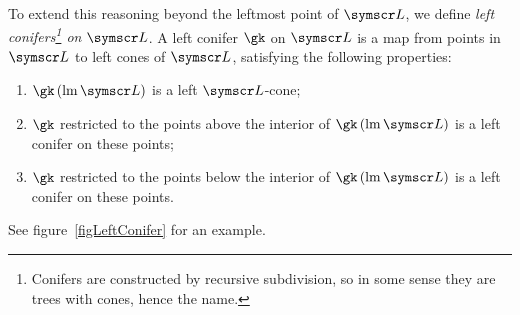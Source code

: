 To extend this reasoning beyond the leftmost point of $\pointset L$, we define \emph{left conifers\footnote{Conifers are
constructed by recursive subdivision, so in some sense they are trees with cones, hence the name.}
on $\pointset L$}.
A left conifer $\gk$ on $\pointset L$ is a map from points in $\pointset L$ to left
cones of $\pointset L$,
satisfying the following properties:
\begin{enumerate}
\item $\gk\of{\leftmost\pointset L}$ is a left $\pointset L$-cone;
\item $\gk$ restricted to the points above the interior of $\gk\of{\leftmost\pointset L}$ is a left conifer on these points;
\item $\gk$ restricted to the points below the interior of $\gk\of{\leftmost\pointset L}$ is a left conifer on these points.
\end{enumerate}
See figure~\ref{figLeftConifer} for an example.
